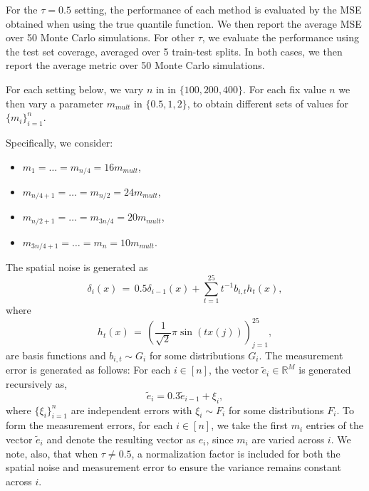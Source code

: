 \documentclass[twoside,11pt]{article}
\begin{document}
For the $\tau = 0.5$ setting, the performance of each method is evaluated by the MSE obtained when using the true quantile function. We then report the average MSE over 50 Monte Carlo simulations. For other $\tau$, we evaluate the performance using the test set coverage, averaged over 5 train-test splits. In both cases, we then report the average metric over 50 Monte Carlo simulations. 

For each setting below, we vary \( n \) in in \( \{100, 200, 400\} \). For each fix value \( n \) we then vary a parameter \( m_{mult} \) in \( \{0.5, 1, 2\} \), to obtain different sets of values for \( \{m_i\}_{i=1}^{n} \).


 Specifically, we consider:
\begin{itemize}
    \item \( m_1 = \ldots = m_{n/4} = 16m_{mult} \),
    \item \( m_{n/4+1} = \ldots = m_{n/2} = 24m_{mult} \),
    \item \( m_{n/2+1} = \ldots = m_{3n/4} = 20m_{mult} \),
    \item \( m_{3n/4+1} = \ldots = m_n = 10m_{mult} \).
\end{itemize}



The spatial noise is generated as 
\begin{equation}\label{eq:st_delta_def}
\delta_i(x) \,=\, 0.5\delta_{i-1}(x) + \sum_{t=1}^{25} t^{-1}b_{i,t}h_t(x), 
\end{equation}
where
\begin{equation}
\label{eq:h_t_def}
h_t(x) \,=\, \left(\frac{1}{\sqrt{2}}\pi \sin(tx(j))\right)_{j=1}^{25},
\end{equation}
are basis functions and $b_{i,t}\sim G_i$ for some distributions $G_i$. The measurement error is generated as follows: For each \(i \in [n]\), the vector \(\tilde e_i \in \mathbb{R}^M\) is generated recursively as, 
\begin{equation}\label{eq:st_e_def}
\tilde e_i = 0.3 \tilde e_{i-1} + \xi_i,
\end{equation}
where \(\{\xi_{i}\}_{i=1}^{n}\) are independent errors with $\xi_i \sim F_i$ for some distributions $F_i$. To form the measurement errors, for each \(i \in [n]\), we take the first \(m_i\) entries of the vector \(\tilde e_i\) and denote the resulting vector as \(e_i\), since $m_i$ are varied across $i$. We note, also, that when $\tau \neq 0.5$, a normalization factor is included for both the spatial noise and measurement error to ensure the variance remains constant across $i$. 
\end{document}
